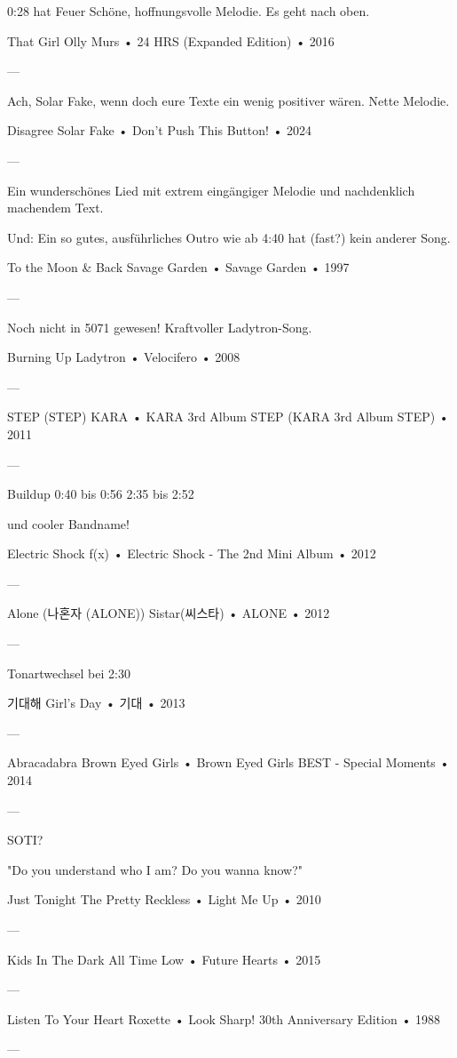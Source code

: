 0:28 hat Feuer
Schöne, hoffnungsvolle Melodie. Es geht nach oben.

That Girl
Olly Murs
 •
24 HRS (Expanded Edition)
 •
2016

—

Ach, Solar Fake, wenn doch eure Texte ein wenig positiver wären.
Nette Melodie.

Disagree
Solar Fake
 •
Don't Push This Button!
 •
2024

—

Ein wunderschönes Lied mit extrem eingängiger Melodie und nachdenklich machendem Text.

Und: Ein so gutes, ausführliches Outro wie ab 4:40 hat (fast?) kein anderer Song.

To the Moon & Back
Savage Garden
 •
Savage Garden
 •
1997

—

Noch nicht in 5071 gewesen!
Kraftvoller Ladytron-Song.

Burning Up
Ladytron
 •
Velocifero
 •
2008

—

STEP (STEP)
KARA
 •
KARA 3rd Album STEP (KARA 3rd Album STEP)
 •
2011

—

Buildup
0:40 bis 0:56
2:35 bis 2:52

und cooler Bandname!

Electric Shock
f(x)
 •
Electric Shock - The 2nd Mini Album
 •
2012

—

Alone (나혼자 (ALONE))
Sistar(씨스타)
 •
ALONE
 •
2012

—

Tonartwechsel bei 2:30

기대해
Girl's Day
 •
기대
 •
2013

—

Abracadabra
Brown Eyed Girls
 •
Brown Eyed Girls BEST - Special Moments
 •
2014

—

SOTI?

"Do you understand who I am?
Do you wanna know?"

Just Tonight
The Pretty Reckless
 •
Light Me Up
 •
2010

—

Kids In The Dark
All Time Low
 •
Future Hearts
 •
2015

—

Listen To Your Heart
Roxette
 •
Look Sharp! 30th Anniversary Edition
 •
1988

—

